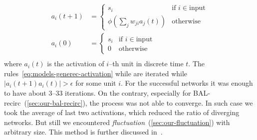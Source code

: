 \begin{align}
  \label{eq:models-generec-activation}
  a_i(t+1) &= \left\{
	\begin{array}{ll}
		s_i & \mbox{if } i \in \mbox{input} \nonumber \\
		\phi(\sum_j w_{ji}a_j(t)) & \mbox{otherwise} \nonumber 
	\end{array}
\right. \\
  a_i(0) &= \left\{
	\begin{array}{ll}
		s_i & \mbox{if } i \in \mbox{input} \nonumber \\
		0 & \mbox{otherwise} \nonumber
	\end{array}
\right. \\
\end{align} 
\label{sec:generec-fluctuation}
where $a_i(t)$ is the activation of $i$--th unit in discrete time $t$. The rules~\ref{eq:models-generec-activation} while are iterated while $|a_i(t+1) a_i(t)| > \epsilon$ for some unit $i$. For the successful networks it was enough to have about 3--33 iterations. On the contrary, especially for BAL-recirc~(\ref{sec:our-bal-recirc}), the process was not able to converge. In such case we took the average of last two activations, which reduced the ratio of diverging networks. But still we encountered \emph{fluctuation}~(\ref{sec:our-fluctuation}) with arbitrary size. This method is further discussed in~\citet{orru2008sabio}.

